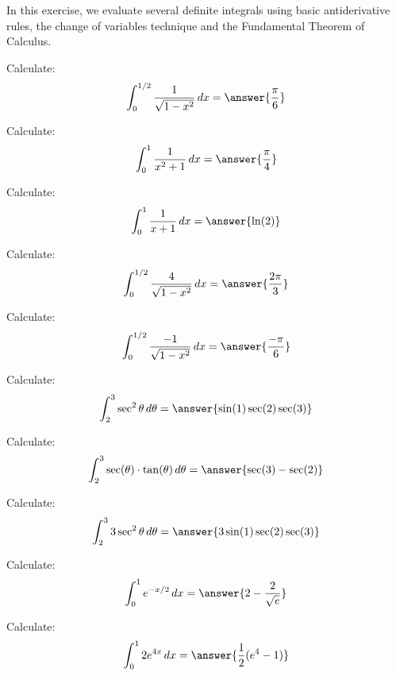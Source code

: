 \documentclass{ximera}
\author{}
\begin{document}
\begin{exercise}

In this exercise, we evaluate several definite integrals using basic antiderivative rules, the change of variables technique  and the Fundamental Theorem of Calculus. 

\begin{problem} Calculate:
\[
\int_0^{1/2} \frac{1}{\sqrt{1-x^2}} \d x =\answer{\frac{\pi }{6}}
\]
\end{problem}


\begin{problem} Calculate:
\[
\int_0^1 \frac{1}{x^2 + 1} \d x = \answer{\frac{\pi }{4}}
\]
\end{problem}



\begin{problem} Calculate:
\[
\int_0^1 \frac{1}{x + 1} \d x = \answer{\ln(2)}
\]
\end{problem}


\begin{problem} Calculate:
\[
\int_0^{1/2} \frac{4}{\sqrt{1 - x^2}} \d x = \answer{\frac{2\pi }{3}}
\]
\end{problem}


\begin{problem} Calculate:
\[
\int_0^{1/2} \frac{-1}{\sqrt{1 - x^2}} \d x = \answer{\frac{-\pi }{6}}
\]
\end{problem}


\begin{problem} Calculate:
\[
\int_2^3 \sec^2 \theta  \d \theta = \answer{\sin(1) \sec(2) \sec(3)}
\]
\end{problem}



\begin{problem} Calculate:
\[
\int_2^3 \sec(\theta)\cdot \tan(\theta)  \d \theta = \answer{\sec(3)-\sec(2)}
\]
\end{problem}



\begin{problem} Calculate:
\[
\int_2^3 3\sec^2\theta  \d \theta = \answer{3 \sin (1) \sec (2) \sec (3)}
\]
\end{problem}


\begin{problem} Calculate:
\[
\int_0^1 e^{-x/2} \d x = \answer{2-\frac{2}{\sqrt{e}}}
\]
\end{problem}



\begin{problem} Calculate:
\[
\int_0^1 2e^{4x} \d x = \answer{\frac{1}{2} (e^4-1)}
\]
\end{problem}





\end{exercise}
\end{document}
